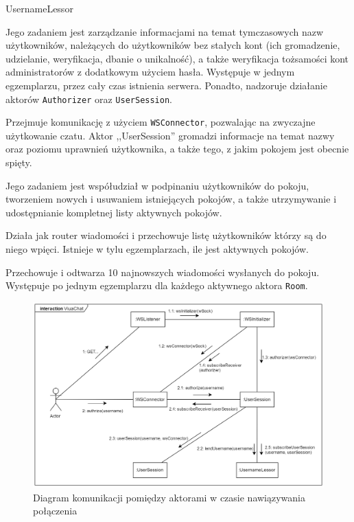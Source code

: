 \begin{labeling}{UsernameLessor}
  \item[\texttt{UsernameLessor}] Jego zadaniem jest zarządzanie informacjami na
  temat tymczasowych nazw użytkowników, należących do	użytkowników bez stałych
  kont (ich gromadzenie, udzielanie, weryfikacja, dbanie o unikalność), a także
  weryfikacja tożsamości kont administratorów z dodatkowym użyciem hasła.
  Występuje w jednym egzemplarzu, przez cały czas istnienia serwera. Ponadto,
  nadzoruje działanie aktorów \texttt{Authorizer} oraz \texttt{UserSession}.

  \item[\texttt{UserSession}] Przejmuje komunikację z użyciem
  \texttt{WSConnector}, pozwalając na zwyczajne użytkowanie czatu. Aktor
  ,,UserSession'' gromadzi informacje na temat nazwy oraz poziomu uprawnień
  użytkownika, a także tego, z jakim pokojem jest obecnie spięty.

  \item[\texttt{Landlord}] Jego zadaniem jest współudział w podpinaniu
  użytkowników do pokoju, tworzeniem nowych i usuwaniem istniejących pokojów, a
  także utrzymywanie i udostępnianie kompletnej listy aktywnych pokojów.

  \item[\texttt{Room}] Działa jak router wiadomości i przechowuje listę użytkowników którzy są do niego wpięci. Istnieje w tylu egzemplarzach, ile jest aktywnych pokojów.

  \item[\texttt{MessageBuffer}] Przechowuje i odtwarza 10 najnowszych wiadomości wysłanych do pokoju. Występuje po jednym egzemplarzu dla każdego aktywnego aktora \texttt{Room}.

\end{labeling}

\begin{figure}[!htp]
	\centering
	\includegraphics[width=\textwidth]{chat/fig/com-diag-init}
	\caption{Diagram komunikacji pomiędzy aktorami w czasie nawiązywania połączenia}
	\label{com-diag-init}
\end{figure}


